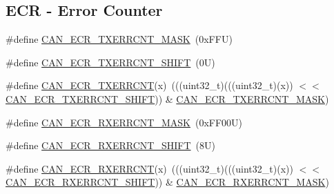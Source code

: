 \subsection*{E\+CR -\/ Error Counter}
\begin{DoxyCompactItemize}
\item 
\#define \mbox{\hyperlink{group___c_a_n___register___masks_gae4da1b026e86291036b8b7d7e78bffa7}{C\+A\+N\+\_\+\+E\+C\+R\+\_\+\+T\+X\+E\+R\+R\+C\+N\+T\+\_\+\+M\+A\+SK}}~(0x\+F\+F\+U)
\item 
\#define \mbox{\hyperlink{group___c_a_n___register___masks_ga4f1e9e374563ef6c0502d1a441caf396}{C\+A\+N\+\_\+\+E\+C\+R\+\_\+\+T\+X\+E\+R\+R\+C\+N\+T\+\_\+\+S\+H\+I\+FT}}~(0\+U)
\item 
\#define \mbox{\hyperlink{group___c_a_n___register___masks_ga64aaa4f8bafb2c1e5e79adf2acdc50fb}{C\+A\+N\+\_\+\+E\+C\+R\+\_\+\+T\+X\+E\+R\+R\+C\+NT}}(x)~(((uint32\+\_\+t)(((uint32\+\_\+t)(x)) $<$$<$ \mbox{\hyperlink{group___c_a_n___register___masks_ga4f1e9e374563ef6c0502d1a441caf396}{C\+A\+N\+\_\+\+E\+C\+R\+\_\+\+T\+X\+E\+R\+R\+C\+N\+T\+\_\+\+S\+H\+I\+FT}})) \& \mbox{\hyperlink{group___c_a_n___register___masks_gae4da1b026e86291036b8b7d7e78bffa7}{C\+A\+N\+\_\+\+E\+C\+R\+\_\+\+T\+X\+E\+R\+R\+C\+N\+T\+\_\+\+M\+A\+SK}})
\item 
\#define \mbox{\hyperlink{group___c_a_n___register___masks_gaed0f3cf7cea69b12a5166e67ad58b98e}{C\+A\+N\+\_\+\+E\+C\+R\+\_\+\+R\+X\+E\+R\+R\+C\+N\+T\+\_\+\+M\+A\+SK}}~(0x\+F\+F00\+U)
\item 
\#define \mbox{\hyperlink{group___c_a_n___register___masks_ga8211d5f10448105a549f3f4085813922}{C\+A\+N\+\_\+\+E\+C\+R\+\_\+\+R\+X\+E\+R\+R\+C\+N\+T\+\_\+\+S\+H\+I\+FT}}~(8\+U)
\item 
\#define \mbox{\hyperlink{group___c_a_n___register___masks_gadbfcb3b6cf61b7a16a75f31d40cab98c}{C\+A\+N\+\_\+\+E\+C\+R\+\_\+\+R\+X\+E\+R\+R\+C\+NT}}(x)~(((uint32\+\_\+t)(((uint32\+\_\+t)(x)) $<$$<$ \mbox{\hyperlink{group___c_a_n___register___masks_ga8211d5f10448105a549f3f4085813922}{C\+A\+N\+\_\+\+E\+C\+R\+\_\+\+R\+X\+E\+R\+R\+C\+N\+T\+\_\+\+S\+H\+I\+FT}})) \& \mbox{\hyperlink{group___c_a_n___register___masks_gaed0f3cf7cea69b12a5166e67ad58b98e}{C\+A\+N\+\_\+\+E\+C\+R\+\_\+\+R\+X\+E\+R\+R\+C\+N\+T\+\_\+\+M\+A\+SK}})
\end{DoxyCompactItemize}
